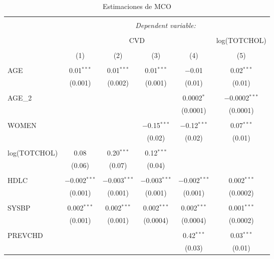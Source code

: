 
\begin{table}[!htbp] \centering 
  \caption{Estimaciones de MCO} 
  \label{tab:tabla_regresiones} 
\footnotesize 
\begin{tabular}{@{\extracolsep{1pt}}lccccc} 
\\[-1.8ex]\hline 
\hline \\[-1.8ex] 
 & \multicolumn{5}{c}{\textit{Dependent variable:}} \\ 
\cline{2-6} 
\\[-1.8ex] & \multicolumn{4}{c}{CVD} & log(TOTCHOL) \\ 
\\[-1.8ex] & (1) & (2) & (3) & (4) & (5)\\ 
\hline \\[-1.8ex] 
 AGE & 0.01$^{***}$ & 0.01$^{***}$ & 0.01$^{***}$ & $-$0.01 & 0.02$^{***}$ \\ 
  & (0.001) & (0.002) & (0.001) & (0.01) & (0.01) \\ 
  & & & & & \\ 
 AGE\_2 &  &  &  & 0.0002$^{*}$ & $-$0.0002$^{***}$ \\ 
  &  &  &  & (0.0001) & (0.0001) \\ 
  & & & & & \\ 
 WOMEN &  &  & $-$0.15$^{***}$ & $-$0.12$^{***}$ & 0.07$^{***}$ \\ 
  &  &  & (0.02) & (0.02) & (0.01) \\ 
  & & & & & \\ 
 log(TOTCHOL) & 0.08 & 0.20$^{***}$ & 0.12$^{***}$ &  &  \\ 
  & (0.06) & (0.07) & (0.04) &  &  \\ 
  & & & & & \\ 
 HDLC & $-$0.002$^{***}$ & $-$0.003$^{***}$ & $-$0.003$^{***}$ & $-$0.002$^{***}$ & 0.002$^{***}$ \\ 
  & (0.001) & (0.001) & (0.001) & (0.001) & (0.0002) \\ 
  & & & & & \\ 
 SYSBP & 0.002$^{***}$ & 0.002$^{***}$ & 0.002$^{***}$ & 0.002$^{***}$ & 0.001$^{***}$ \\ 
  & (0.001) & (0.001) & (0.0004) & (0.0004) & (0.0002) \\ 
  & & & & & \\ 
 PREVCHD &  &  &  & 0.42$^{***}$ & 0.03$^{***}$ \\ 
  &  &  &  & (0.03) & (0.01) \\ 

\end{tabular}
\end{table}
